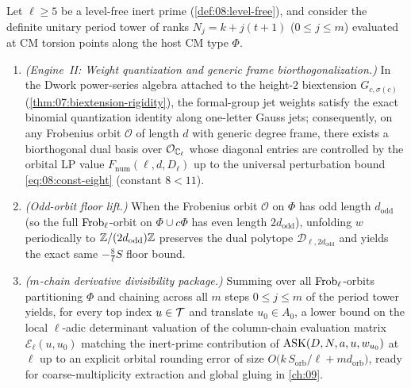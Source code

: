 \begin{theorem}
\label{thm:08:inert-deriv}
Let $\ell \ge 5$ be a level-free inert prime (\cref{def:08:level-free}), and consider the definite unitary period tower of ranks $N_j = k + j(t+1)$ ($0 \le j \le m$) evaluated at CM torsion points along the host CM type $\Phi$.
\begin{enumerate}[label=\textup{(\roman*)}]
\item \emph{(Engine~II: Weight quantization and generic frame biorthogonalization.)} In the Dwork power-series algebra attached to the height-$2$ biextension $G_{c,\sigma(c)}$ (\cref{thm:07:biextension-rigidity}), the formal-group jet weights satisfy the exact binomial quantization identity along one-letter Gauss jets; consequently, on any Frobenius orbit $\mathcal{O}$ of length $d$ with generic degree frame, there exists a biorthogonal dual basis over $\mathcal{O}_{\mathbb{C}_\ell}$ whose diagonal entries are controlled by the orbital LP value $F_{\mathrm{num}}(\ell, d, D_\ell)$ up to the universal perturbation bound \eqref{eq:08:const-eight} (constant $8 < 11$).
\item \emph{(Odd-orbit floor lift.)} When the Frobenius orbit $\mathcal{O}$ on $\Phi$ has odd length $d_{\mathrm{odd}}$ (so the full $\mathrm{Frob}_\ell$-orbit on $\Phi \cup c\Phi$ has even length $2d_{\mathrm{odd}}$), unfolding $w$ periodically to $\mathbb{Z}/(2d_{\mathrm{odd}})\mathbb{Z}$ preserves the dual polytope $\mathcal{D}_{\ell, 2d_{\mathrm{odd}}}$ and yields the exact same $-\frac{8}{\ell} S$ floor bound.
\item \emph{($m$-chain derivative divisibility package.)} Summing over all $\mathrm{Frob}_\ell$-orbits partitioning $\Phi$ and chaining across all $m$ steps $0 \le j \le m$ of the period tower yields, for every top index $u \in \mathcal{T}$ and translate $u_0 \in A_0$, a lower bound on the local $\ell$-adic determinant valuation of the column-chain evaluation matrix $\mathcal{E}_\ell(u, u_0)$ matching the inert-prime contribution of $\mathrm{ASK}(D, N, a, u, w_{u_0})$ at $\ell$ up to an explicit orbital rounding error of size $O\bigl(k\, S_{\mathrm{orb}} / \ell + m d_{\mathrm{orb}}\bigr)$, ready for coarse-multiplicity extraction and global gluing in \cref{ch:09}.
\end{enumerate}
\end{theorem}


